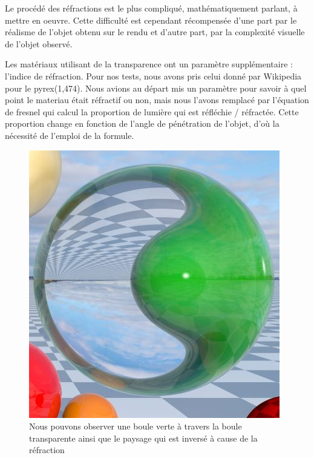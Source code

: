 Le procédé des réfractions est le plus compliqué, mathématiquement parlant, à mettre en oeuvre. Cette difficulté est cependant récompensée d'une part par le réalisme de l'objet obtenu sur le rendu et d'autre part, par la complexité visuelle de l'objet observé.

Les matériaux utilisant de la transparence ont un paramètre supplémentaire : l'indice de réfraction. Pour nos tests, nous avons pris celui donné par Wikipedia pour le pyrex(1,474). Nous avions au départ mis un paramètre pour savoir à quel point le materiau était réfractif ou non, mais nous l'avons remplacé par l'équation de fresnel qui calcul la proportion de lumière qui est réfléchie / réfractée. Cette proportion change en fonction de l'angle de pénétration de l'objet, d'où la nécessité de l'emploi de la formule.

\begin{figure}[h]
   \begin{center}
       \includegraphics[scale=0.8]{img/rt/refractions.jpg}
   \end{center}
   \caption{Nous pouvons observer une boule verte à travers la boule transparente ainsi que le paysage qui est inversé à cause de la réfraction}
\end{figure}
\FloatBarrier
